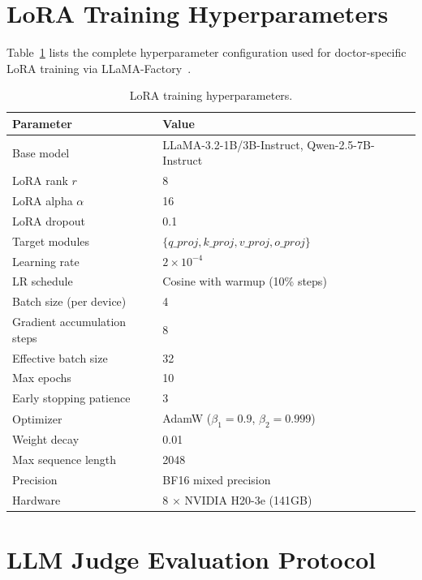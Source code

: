 \appendix



\section{LoRA Training Hyperparameters}

Table~\ref{tab:hyperparams} lists the complete hyperparameter configuration used for doctor-specific LoRA training via LLaMA-Factory~\cite{zheng2024llamafactory}.

\begin{table}[H]
\caption{LoRA training hyperparameters.\label{tab:hyperparams}}
\begin{tabularx}{\textwidth}{lX}
\toprule
\textbf{Parameter} & \textbf{Value} \\
\midrule
Base model & LLaMA-3.2-1B/3B-Instruct, Qwen-2.5-7B-Instruct \\
LoRA rank $r$ & 8 \\
LoRA alpha $\alpha$ & 16 \\
LoRA dropout & 0.1 \\
Target modules & $\{q\_proj, k\_proj, v\_proj, o\_proj\}$ \\
Learning rate & $2 \times 10^{-4}$ \\
LR schedule & Cosine with warmup (10\% steps) \\
Batch size (per device) & 4 \\
Gradient accumulation steps & 8 \\
Effective batch size & 32 \\
Max epochs & 10 \\
Early stopping patience & 3 \\
Optimizer & AdamW ($\beta_1=0.9$, $\beta_2=0.999$) \\
Weight decay & 0.01 \\
Max sequence length & 2048 \\
Precision & BF16 mixed precision \\
Hardware & 8 $\times$ NVIDIA H20-3e (141GB) \\
\bottomrule
\end{tabularx}
\end{table}

\section{LLM Judge Evaluation Protocol}

